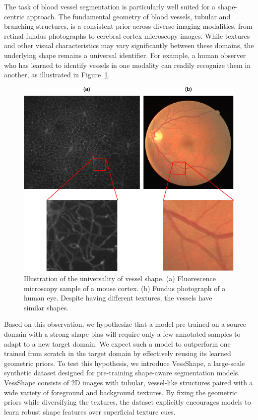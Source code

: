 \documentclass[%
reprint,
nofootinbib,
 amsmath,amssymb,
aps,
superscriptaddress,
showkeys,
longbibliography
]{revtex4-1}
\begin{document}
The task of blood vessel segmentation is particularly well suited for a shape-centric approach. The fundamental geometry of blood vessels, tubular and branching structures, is a consistent prior across diverse imaging modalities, from retinal fundus photographs to cerebral cortex microscopy images. While textures and other visual characteristics may vary significantly between these domains, the underlying shape remains a universal identifier. For example, a human observer who has learned to identify vessels in one modality can readily recognize them in another, as illustrated in Figure~\ref{f:motivation}.

\begin{figure}[tbp]
    \centering
    \includegraphics[width=\columnwidth]{figures/vessel_retinal_cortex.pdf}
    \caption{Illustration of the universality of vessel shape. (a) Fluorescence microscopy sample of a mouse cortex. (b) Fundus photograph of a human eye. Despite having different textures, the vessels have similar shapes.}
    \label{f:motivation}
\end{figure}

Based on this observation, we hypothesize that a model pre-trained on a source domain with a strong shape bias will require only a few annotated samples to adapt to a new target domain. We expect such a model to outperform one trained from scratch in the target domain by effectively reusing its learned geometric priors. To test this hypothesis, we introduce VessShape, a large-scale synthetic dataset designed for pre-training shape-aware segmentation models. VessShape consists of 2D images with tubular, vessel-like structures paired with a wide variety of foreground and background textures. By fixing the geometric priors while diversifying the textures, the dataset explicitly encourages models to learn robust shape features over superficial texture cues.
\end{document}
